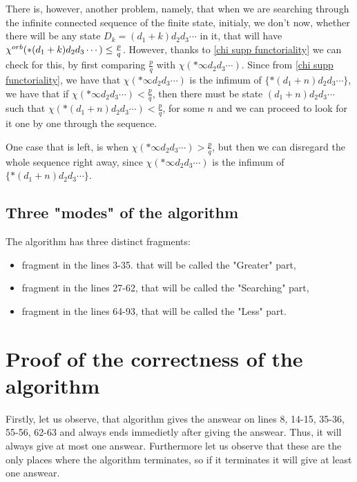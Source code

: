 There is, however, another problem, namely, that when we are searching through 
the infinite connected sequence of the finite state, 
initialy, we don't now, whether there will be any state 
$D_k = (d_1+k)d_2d_3\cdots$ in it, that 
will have ${\chi^{orb}(*(d_1+k)d_2d_3\cdots)} \leq \frac{p}{q}$. 
However, thanks to \ref{chi supp functoriality} 
we can check for this, by first comparing $\frac{p}{q}$ with $\chi(*\infty d_2d_3\cdots)$. 
Since from \ref{chi supp functoriality}, we have that 
$\chi(*\infty d_2d_3\cdots)$ is the infimum of $\{*(d_1+n)d_2d_3\cdots\}$, 
we have that if $\chi(*\infty d_2d_3\cdots) < \frac{p}{q}$, then
there must be state $(d_1+n)d_2d_3\cdots$ such that $\chi(*(d_1+n)d_2d_3\cdots) < \frac{p}{q}$, 
for some $n$ and we can proceed to look for it one by one through the sequence.

One case that is left, is when $\chi(*\infty d_2d_3\cdots) > \frac{p}{q}$, but then we can 
disregard the whole sequence right away, since 
$\chi(*\infty d_2d_3\cdots)$ is the infimum of $\{*(d_1+n)d_2d_3\cdots\}$.


\subsection{Three "modes" of the algorithm}
The algorithm has three distinct fragments: 
\begin{itemize}
\item fragment in the lines 3-35. that will be called the "Greater" part,
\item fragment in the lines 27-62, that will be called the "Searching" part,
\item fragment in the lines 64-93, that will be called the "Less" part.
\end{itemize}


\section{Proof of the correctness of the algorithm}
Firstly, let us observe, that algorithm gives the answear on lines 8, 14-15, 35-36, 55-56, 
62-63 and 
always ends immedietly after giving the answear. Thus, it will always give at most one answear.
Furthermore let us observe that these are the only places where the algorithm terminates, 
so if it terminates it will give at least one answear.
 

